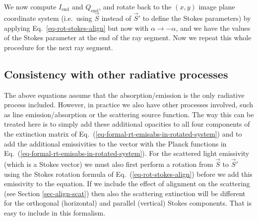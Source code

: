 \documentclass{report}
\begin{document}
We now compute $I_{\mathrm{end}}$ and $Q_{\mathrm{end}}$, and rotate back to
the $(x,y)$ image plane coordinate system (i.e.~using $\vec S$ instead of
$\vec S'$ to define the Stokes parameters) by applying
Eq.~\ref{eq-rot-stokes-align} but now with $\alpha\rightarrow -\alpha$, and
we have the values of the Stokes parameter at the end of the ray
segment. Now we repeat this whole procedure for the next ray segment.


\subsection{Consistency with other radiative processes}
The above equations assume that the absorption/emission is the only
radiative process included. However, in practice we also have other
processes involved, such as line emission/absorption or the scattering
source function. The way this can be treated here is to simply add these
additional opacities to all four components of the extinction matrix of
Eq.~(\ref{eq-formal-rt-emisabs-in-rotated-system}) and to add the additional
emissivities to the vector with the Planck functions in
Eq.~(\ref{eq-formal-rt-emisabs-in-rotated-system}). For the scattered light
emissivity (which is a Stokes vector) we must also first perform a rotation
from $\vec S$ to $\vec S'$ using the Stokes rotation formula of
Eq.~(\ref{eq-rot-stokes-align}) before we add this emissivity to the
equation. If we include the effect of alignment on the scattering
(see Section \ref{sec-align-scat}) then also the scattering extinction
will be different for the orthogonal (horizontal) and parallel (vertical)
Stokes components. That is easy to include in this formalism.
\end{document}
